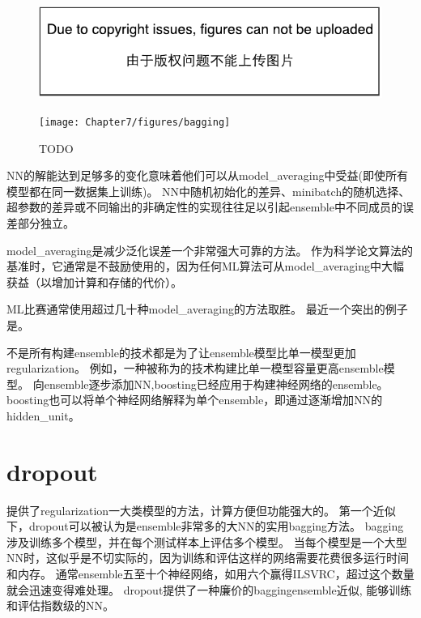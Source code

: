 \begin{figure}[!htb]
\ifOpenSource
\centerline{\includegraphics{figure.pdf}}
\else
\centerline{\texttt{[image: Chapter7/figures/bagging]}}
\fi
\caption{TODO}
\label{fig:chap7_bagging}
\end{figure}

\gls{NN}的解能达到足够多的变化意味着他们可以从\gls{model_averaging}中受益(即使所有模型都在同一数据集上训练)。
\gls{NN}中随机初始化的差异、\gls{minibatch}的随机选择、超参数的差异或不同输出的非确定性的实现往往足以引起\gls{ensemble}中不同成员的误差部分独立。


\gls{model_averaging}是减少泛化误差一个非常强大可靠的方法。
作为科学论文算法的基准时，它通常是不鼓励使用的，因为任何\gls{ML}算法可从\gls{model_averaging}中大幅获益（以增加计算和存储的代价）。

\gls{ML}比赛通常使用超过几十种\gls{model_averaging}的方法取胜。
最近一个突出的例子是\citep{Koren09}。

不是所有构建\gls{ensemble}的技术都是为了让\gls{ensemble}模型比单一模型更加\gls{regularization}。
例如，一种被称为的技术\citep{ConfLT:Freund:gametheorie,ConfLT:Freund:gametheorie}构建比单一模型容量更高\gls{ensemble}模型。
向\gls{ensemble}逐步添加\gls{NN},\gls{boosting}已经应用于构建神经网络的\gls{ensemble}\citep{Schwenk-nips10}。
\gls{boosting}也可以将单个神经网络解释为单个\gls{ensemble}，即通过逐渐增加\gls{NN}的\gls{hidden_unit}。

\section{\gls{dropout}}
\label{sec:dropout}
\citep{Srivastava14}提供了\gls{regularization}一大类模型的方法，计算方便但功能强大的。
第一个近似下，\gls{dropout}可以被认为是\gls{ensemble}非常多的大\gls{NN}的实用\gls{bagging}方法。
\gls{bagging}涉及训练多个模型，并在每个测试样本上评估多个模型。
当每个模型是一个大型\gls{NN}时，这似乎是不切实际的，因为训练和评估这样的网络需要花费很多运行时间和内存。
通常\gls{ensemble}五至十个神经网络，如\cite{Szegedy-et-al-arxiv2014}用六个赢得ILSVRC，超过这个数量就会迅速变得难处理。
\gls{dropout}提供了一种廉价的\gls{bagging}\gls{ensemble}近似,
能够训练和评估指数级的\gls{NN}。

